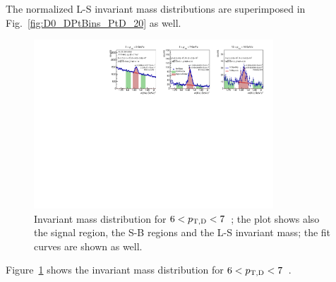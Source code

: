The normalized L-S invariant mass distributions are superimposed in Fig.~\ref{fig:D0_DPtBins_PtD_20} as well.
\begin{figure}[tbh]
\begin{center}
\includegraphics[width=0.8\textwidth]{img/HQ16_Simulation_InvMassSB}
 \caption{Invariant mass distribution for $6 < p_{\mathrm{T,D}} < 7$~\GeVc; the plot shows also the signal region, the S-B regions and the L-S invariant mass; the fit curves are shown as well.} 
 \label{fig:HQ16_Simulation_InvMassSB}
\end{center}
\end{figure}
Figure~\ref{fig:HQ16_Simulation_InvMassSB} shows the invariant mass distribution for $6 < p_{\mathrm{T,D}} < 7$~\GeVc. 

